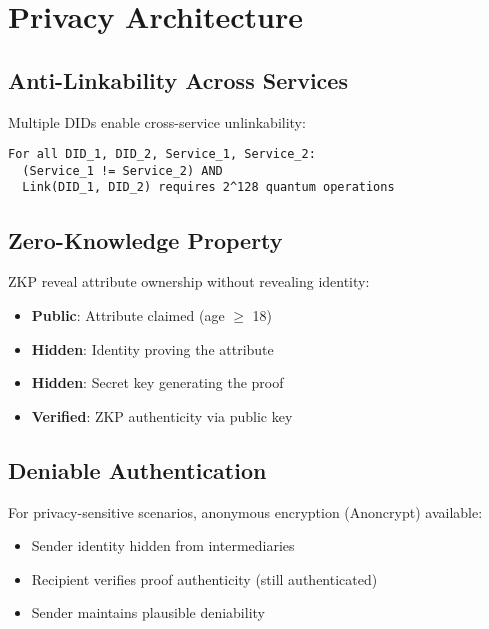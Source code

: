 \chapter{Privacy Architecture}

\section{Anti-Linkability Across Services}

Multiple DIDs enable cross-service unlinkability:

\begin{verbatim}
For all DID_1, DID_2, Service_1, Service_2:
  (Service_1 != Service_2) AND
  Link(DID_1, DID_2) requires 2^128 quantum operations
\end{verbatim}

\section{Zero-Knowledge Property}

ZKP reveal attribute ownership without revealing identity:

\begin{itemize}
  \item \textbf{Public}: Attribute claimed (age $\geq$ 18)
  \item \textbf{Hidden}: Identity proving the attribute
  \item \textbf{Hidden}: Secret key generating the proof
  \item \textbf{Verified}: ZKP authenticity via public key
\end{itemize}

\section{Deniable Authentication}

For privacy-sensitive scenarios, anonymous encryption (Anoncrypt) available:

\begin{itemize}
  \item Sender identity hidden from intermediaries
  \item Recipient verifies proof authenticity (still authenticated)
  \item Sender maintains plausible deniability
\end{itemize}

